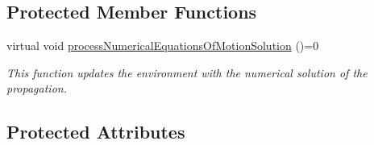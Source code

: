 \subsection*{Protected Member Functions}
\begin{DoxyCompactItemize}
\item 
virtual void \hyperlink{classtudat_1_1propagators_1_1DynamicsSimulator_a95e587944d4cef24d68b4b72a3c0fee3}{process\+Numerical\+Equations\+Of\+Motion\+Solution} ()=0
\begin{DoxyCompactList}\small\item\em This function updates the environment with the numerical solution of the propagation. \end{DoxyCompactList}\end{DoxyCompactItemize}
\subsection*{Protected Attributes}
